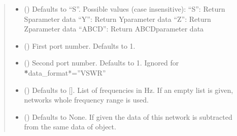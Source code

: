\documentclass[letterpaper,10pt,english]{sphinxmanual}
\begin{document}
\begin{fulllineitems}
\begin{fulllineitems}
\begin{quote}
\begin{description}
\begin{itemize}
\sphinxhyphen{}   “MU2”: Output stability factor of 2\sphinxhyphen{}port
\sphinxhyphen{}   “VSWR”: VSWR ar port i
\sphinxhyphen{}   “MAG”: Magnitude of \(M_{i j}\)
\sphinxhyphen{}   “DB”: Magnitude of \(M_{i j}\) in dB
\sphinxhyphen{}   “REAL”: Real part of \(M_{i j}\)
\sphinxhyphen{}   “IMAG”: Imaginary part of \(M_{i j}\)
\sphinxhyphen{}   “PHASE”: Phase of \(M_{i j}\) in degrees between 0\sphinxhyphen{}360
\sphinxhyphen{}   “UNWRAPPEDPHASE”: Unwrapped Phase of \(M_{i j}\) in degrees
\sphinxhyphen{}   “GROUPDELAY”: Group Delay of \(M_{i j}\) in degrees

\item {}
\sphinxAtStartPar
{} (\sphinxstyleliteralemphasis{\sphinxupquote{, }}) \textendash{} Defaults to “S”. Possible values (case insensitive):
\sphinxhyphen{}   “S”: Return S\sphinxhyphen{}parameter data
\sphinxhyphen{}   “Y”: Return Y\sphinxhyphen{}parameter data
\sphinxhyphen{}   “Z”: Return Z\sphinxhyphen{}parameter data
\sphinxhyphen{}   “ABCD”: Return ABCD\sphinxhyphen{}parameter data

\item {}
\sphinxAtStartPar
{} (\sphinxstyleliteralemphasis{\sphinxupquote{, }}) \textendash{} First port number. Defaults to 1.

\item {}
\sphinxAtStartPar
{} (\sphinxstyleliteralemphasis{\sphinxupquote{, }}) \textendash{} Second port number. Defaults to 1. Ignored for {\color{red}\bfseries{}*}data\_format*=”VSWR”

\item {}
\sphinxAtStartPar
{} (\sphinxstyleliteralemphasis{\sphinxupquote{, }}) \textendash{} Defaults to {[}{]}. List of frequencies in Hz. If an empty list is given, networks whole frequency range is used.

\item {}
\sphinxAtStartPar
{} ({\hyperref[\detokenize{touchstone:touchstone.spfile}]{}}\sphinxstyleliteralemphasis{\sphinxupquote{, }}) \textendash{} Defaults to None. If given the data of this network is subtracted from the same data of  object.


\end{itemize}
\end{description}
\end{quote}
\end{fulllineitems}
\end{fulllineitems}
\end{document}
